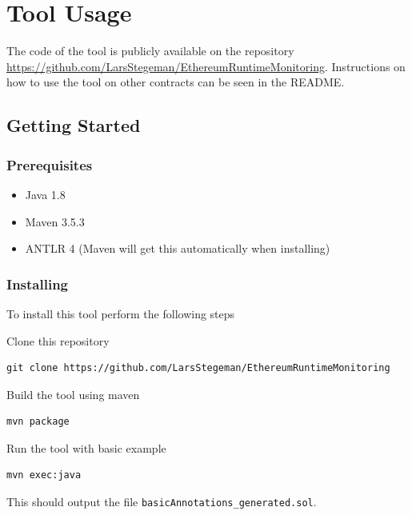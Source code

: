\documentclass[a4paper]{article}
\begin{document}
\newpage
\section{Tool Usage}
The code of the tool is publicly available on the repository \url{https://github.com/LarsStegeman/EthereumRuntimeMonitoring}. Instructions on how to use the tool on other contracts can be seen in the README.

\hypertarget{getting-started}{%
\subsection{Getting Started}\label{getting-started}}

\hypertarget{prerequisites}{%
\subsubsection{Prerequisites}\label{prerequisites}}

\begin{itemize}
\item
  Java 1.8
\item
  Maven 3.5.3
\item
  ANTLR 4 (Maven will get this automatically when installing)
\end{itemize}

\hypertarget{installing}{%
\subsubsection{Installing}\label{installing}}

To install this tool perform the following steps

Clone this repository

\begin{verbatim}
git clone https://github.com/LarsStegeman/EthereumRuntimeMonitoring
\end{verbatim}

Build the tool using maven

\begin{verbatim}
mvn package
\end{verbatim}

Run the tool with basic example

\begin{verbatim}
mvn exec:java
\end{verbatim}

This should output the file \texttt{basicAnnotations\_generated.sol}.
\end{document}
